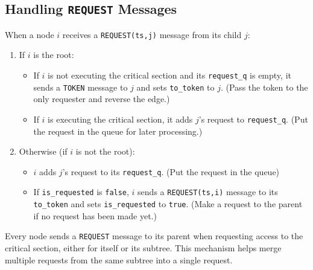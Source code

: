 \subsection{Handling \texttt{REQUEST} Messages}
When a node $i$ receives a \texttt{REQUEST(ts,j)} message from its child $j$:
\begin{enumerate}
    \item If $i$ is the root:
        \begin{itemize}
            \item If $i$ is not executing the critical section and its \texttt{request\_q} is empty, it sends a \texttt{TOKEN} message to $j$ and sets \texttt{to\_token} to $j$. (Pass the token to the only requester and reverse the edge.)
            \item If $i$ is executing the critical section, it adds $j$'s request to \texttt{request\_q}. (Put the request in the queue for later processing.)
        \end{itemize}
    \item Otherwise (if $i$ is not the root):
        \begin{itemize}
            \item $i$ adds $j$'s request to its \texttt{request\_q}. (Put the request in the queue)
            \item If \texttt{is\_requested} is \texttt{false}, $i$ sends a \texttt{REQUEST(ts,i)} message to its \texttt{to\_token} and sets \texttt{is\_requested} to \texttt{true}. (Make a request to the parent if no request has been made yet.)
        \end{itemize}
\end{enumerate}

Every node sends a \texttt{REQUEST} message to its parent when requesting access to the critical section, either for itself or its subtree. This mechanism helps merge multiple requests from the same subtree into a single request.

